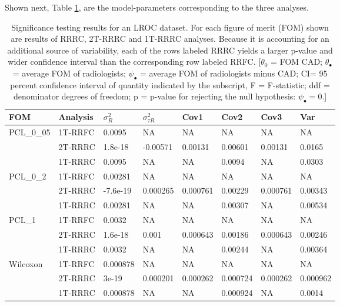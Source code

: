 \documentclass[
]{book}
\begin{document}
Shown next, Table \ref{tab:standalone-cad-table3}, are the model-parameters corresponding to the three analyses.

\begin{table}

\caption{\label{tab:standalone-cad-table3}Significance testing results for an LROC dataset. For each figure of merit (FOM) shown are results of RRRC, 2T-RRRC and 1T-RRRC analyses. Because it is accounting for an additional source of variability, each of the rows labeled RRRC yields a larger p-value and wider confidence interval than the corresponding row labeled RRFC. [$\theta_0$ = FOM CAD; $\theta_{\bullet}$ = average FOM of radiologists; $\psi_{\bullet}$ = average FOM of radiologists minus CAD; CI= 95 percent confidence interval of quantity indicated by the subscript, F = F-statistic; ddf = denominator degrees of freedom; p = p-value for rejecting the null hypothesis: $\psi_{\bullet} = 0$.]}
\centering
\fontsize{10}{12}\selectfont
\begin{tabular}[t]{llllllll}
\toprule
FOM & Analysis & $\sigma_R^2$ & $\sigma_{\tau R}^2$ & Cov1 & Cov2 & Cov3 & Var\\
\midrule
PCL\_0\_05 & 1T-RRFC & 0.0095 & NA & NA & NA & NA & NA\\
 & 2T-RRRC & 1.8e-18 & -0.00571 & 0.00131 & 0.00601 & 0.00131 & 0.0165\\
 & 1T-RRRC & 0.0095 & NA & NA & 0.0094 & NA & 0.0303\\
PCL\_0\_2 & 1T-RRFC & 0.00281 & NA & NA & NA & NA & NA\\
 & 2T-RRRC & -7.6e-19 & 0.000265 & 0.000761 & 0.00229 & 0.000761 & 0.00343\\
\addlinespace
 & 1T-RRRC & 0.00281 & NA & NA & 0.00307 & NA & 0.00534\\
PCL\_1 & 1T-RRFC & 0.0032 & NA & NA & NA & NA & NA\\
 & 2T-RRRC & 1.6e-18 & 0.001 & 0.000643 & 0.00186 & 0.000643 & 0.00246\\
 & 1T-RRRC & 0.0032 & NA & NA & 0.00244 & NA & 0.00364\\
Wilcoxon & 1T-RRFC & 0.000878 & NA & NA & NA & NA & NA\\
\addlinespace
 & 2T-RRRC & 3e-19 & 0.000201 & 0.000262 & 0.000724 & 0.000262 & 0.000962\\
 & 1T-RRRC & 0.000878 & NA & NA & 0.000924 & NA & 0.0014\\
\bottomrule
\end{tabular}
\end{table}
\end{document}
